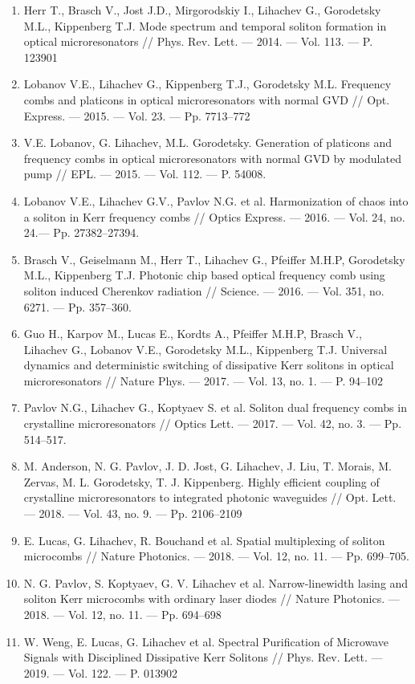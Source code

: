 \begin{enumerate}[label=\sbscript{A}{{\arabic*}}.]
  \item Herr T., Brasch V., Jost J.D., Mirgorodskiy I., Lihachev G., Gorodetsky M.L., Kippenberg T.J. Mode spectrum and temporal soliton formation in optical microresonators // Phys. Rev. Lett. — 2014. — Vol. 113. — P. 123901
  \item Lobanov V.E., Lihachev G., Kippenberg T.J., Gorodetsky M.L. Frequency combs and platicons in optical microresonators with normal GVD // Opt. Express. — 2015. — Vol. 23. — Pp. 7713–772
  \item V.E. Lobanov, G. Lihachev, M.L. Gorodetsky. Generation of platicons and frequency combs in optical microresonators with normal GVD by modulated pump // EPL. — 2015. — Vol. 112. — P. 54008.
  \item Lobanov V.E., Lihachev G.V., Pavlov N.G. et al. Harmonization of chaos into a soliton in Kerr frequency combs // Optics Express. — 2016. — Vol. 24, no. 24.— Pp. 27382–27394.
  \item Brasch V., Geiselmann M., Herr T., Lihachev G., Pfeiffer M.H.P, Gorodetsky M.L., Kippenberg T.J. Photonic chip based optical frequency comb using soliton induced Cherenkov radiation // Science. — 2016. — Vol. 351, no. 6271. — Pp. 357–360.
  \item Guo H., Karpov M., Lucas E., Kordts A., Pfeiffer M.H.P, Brasch V., Lihachev G., Lobanov V.E., Gorodetsky M.L., Kippenberg T.J. Universal dynamics and deterministic switching of dissipative Kerr solitons in optical microresonators // Nature Phys. — 2017. — Vol. 13, no. 1. — P. 94–102
  \item Pavlov N.G., Lihachev G., Koptyaev S. et al. Soliton dual frequency combs in crystalline microresonators // Optics Lett. — 2017. — Vol. 42, no. 3. — Pp. 514–517.
  \item M. Anderson, N. G. Pavlov, J. D. Jost, G. Lihachev, J. Liu, T. Morais, M. Zervas, M. L. Gorodetsky, T. J. Kippenberg. Highly efficient coupling of crystalline microresonators to integrated photonic waveguides // Opt. Lett. — 2018. — Vol. 43, no. 9. — Pp. 2106–2109
  \item E. Lucas, G. Lihachev, R. Bouchand et al. Spatial multiplexing of soliton microcombs // Nature Photonics. — 2018. — Vol. 12, no. 11. — Pp. 699–705.
  \item N. G. Pavlov, S. Koptyaev, G. V. Lihachev et al. Narrow-linewidth lasing and soliton Kerr microcombs with ordinary laser diodes // Nature Photonics. — 2018. — Vol. 12, no. 11. — Pp. 694–698
  \item W. Weng, E. Lucas, G. Lihachev et al.  Spectral Purification of Microwave Signals with Disciplined Dissipative Kerr Solitons // Phys. Rev. Lett. — 2019. — Vol. 122. — P. 013902
\end{enumerate}



